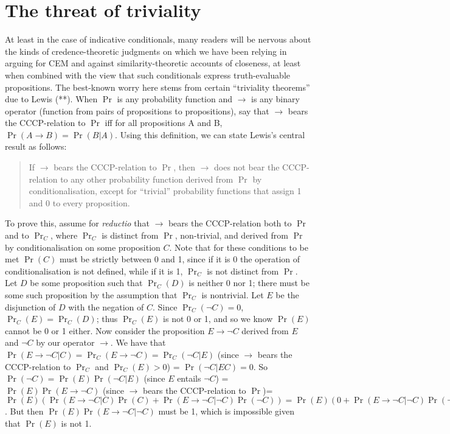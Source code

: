 \documentclass[leqno, 11pt, a5paper, openany]{article}
\DeclareMathOperator{\prob}{Pr}
\begin{document}
\section{The threat of triviality} \label{chances-and-credences-for-conditionals}
At least in the case of indicative conditionals, many readers will be nervous about the kinds of credence-theoretic judgments on which we have been relying in arguing for CEM and against similarity-theoretic accounts of closeness, at least when combined with the view that such conditionals express truth-evaluable propositions. The best-known worry here stems from certain “triviality theorems” due to Lewis (**). When $\prob$ is any probability function and $→$ is any binary operator (function from pairs of propositions to propositions), say that $→$ bears the CCCP-relation to $\prob$ iff for all propositions A and B, $\prob(A→B) = \prob(B|A)$. Using this definition, we can state Lewis's central result as follows:
\begin{quote}
	If $→$ bears the CCCP-relation to $\prob$, then $→$ does not bear the CCCP-relation to any other probability function derived from $\prob$ by conditionalisation, except for “trivial” probability functions that assign 1 and 0 to every proposition. 
\end{quote}
To prove this, assume for \emph{reductio} that $→$ bears the CCCP-relation both to $\prob$ and to $\prob_C$, where $\prob_C$ is distinct from $\prob$, non-trivial, and derived from $\prob$ by conditionalisation on some proposition $C$. Note that for these conditions to be met $\prob(C)$ must be strictly between 0 and 1, since if it is 0 the operation of conditionalisation is not defined, while if it is 1, $\prob_C$ is not distinct from $\prob$. Let $D$ be some proposition such that $\prob_C(D)$ is neither 0 nor 1; there must be some such proposition by the assumption that $\prob_C$ is nontrivial. Let $E$ be the disjunction of $D$ with the negation of $C$. Since $\prob_C(¬C) = 0$, $\prob_C(E) = \prob_C(D)$; thus $\prob_C(E)$ is not 0 or 1, and so we know $\prob(E)$ cannot be 0 or 1 either. Now consider the proposition $E→¬C$ derived from $E$ and $¬C$ by our operator $→$. We have that $\prob(E→¬C|C) = \prob_C(E→¬C) = \prob_C(¬C|E)$ (since $→$ bears the CCCP-relation to $\prob_C$ and $\prob_C(E)>0$) = $\prob(¬C|EC) = 0$. So $\prob(¬C) = \prob(E)\prob(¬C|E)$ (since $E$ entails $¬C$) = $\prob(E)\prob(E→¬C)$ (since $→$ bears the CCCP-relation to $\prob$)= $\prob(E)(\prob(E→¬C|C)\prob(C) + \prob(E→¬C|¬C)\prob(¬C)) = \prob(E)(0 + \prob(E→¬C|¬C)\prob(¬C))$. But then $\prob(E)\prob(E→¬C|¬C)$ must be 1, which is impossible given that $\prob(E)$ is not 1.
\end{document}
